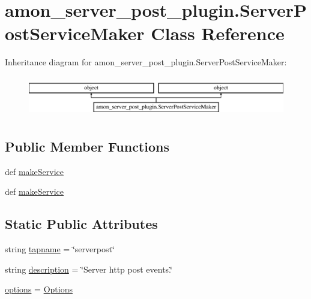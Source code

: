 \hypertarget{classamon__server__post__plugin_1_1_server_post_service_maker}{\section{amon\-\_\-server\-\_\-post\-\_\-plugin.\-Server\-Post\-Service\-Maker Class Reference}
\label{classamon__server__post__plugin_1_1_server_post_service_maker}
}
Inheritance diagram for amon\-\_\-server\-\_\-post\-\_\-plugin.\-Server\-Post\-Service\-Maker\-:\begin{figure}[H]
\begin{center}
\leavevmode
\includegraphics[height=1.794872cm]{d2/d41/classamon__server__post__plugin_1_1_server_post_service_maker}
\end{center}
\end{figure}
\subsection*{Public Member Functions}
\begin{DoxyCompactItemize}
\item 
def \hyperlink{classamon__server__post__plugin_1_1_server_post_service_maker_a9bffb1ce4114dd92a33d835f652170b8}{make\-Service}
\item 
def \hyperlink{classamon__server__post__plugin_1_1_server_post_service_maker_a9bffb1ce4114dd92a33d835f652170b8}{make\-Service}
\end{DoxyCompactItemize}
\subsection*{Static Public Attributes}
\begin{DoxyCompactItemize}
\item 
string \hyperlink{classamon__server__post__plugin_1_1_server_post_service_maker_a4d99413d155a4fd18efe012c18550314}{tapname} = \char`\"{}serverpost\char`\"{}
\item 
string \hyperlink{classamon__server__post__plugin_1_1_server_post_service_maker_a05bfe6bb700fdc34664821194f6fec3b}{description} = \char`\"{}Server http post events.\char`\"{}
\item 
\hyperlink{classamon__server__post__plugin_1_1_server_post_service_maker_aa21d745291714b83201f517a73e6c0ef}{options} = \hyperlink{classamon__server__post__plugin_1_1_options}{Options}
\end{DoxyCompactItemize}


